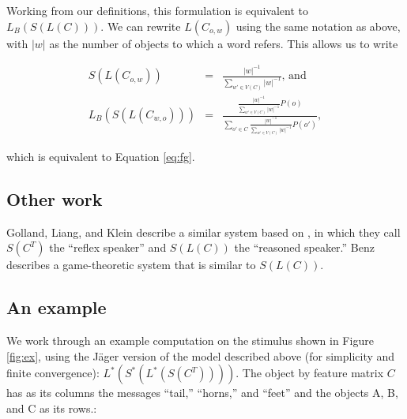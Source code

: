 Working from our definitions, this formulation is equivalent to $L_B(S(L(C)))$. We can rewrite $L(C_{o,w})$ using the same notation as above, with $|w|$ as the number of objects to which a word refers. This allows us to write 

\begin{eqnarray*}
S(L(C_{o,w})) &=& \frac{|w|^{-1}}{\displaystyle \sum_{w' \in V(C)} |w|^{-1}} \mbox{, and} \\
L_B(S(L(C_{w,o}))) &=& \frac{ \frac{\displaystyle |w|^{-1}}{\displaystyle \sum_{w' \in V(C)} |w|^{-1}}P(o)}{\displaystyle\sum_{o' \in C}  \frac{|w|^{-1}}{\displaystyle \sum_{w' \in V(C)} |w|^{-1}}P(o')},
\end{eqnarray*}

which is equivalent to Equation \ref{eq:fg}.

\subsection{Other work}

Golland, Liang, and Klein \cite{golland2010} describe a similar system based on \cite{jaegerinpress}, in which they call $S(C^T)$ the ``reflex speaker'' and $S(L(C))$ the ``reasoned speaker.'' Benz \cite{benz2005b} describes a game-theoretic system that is similar to $S(L(C))$. 

\subsection{An example}


We work through an example computation on the stimulus shown in Figure \ref{fig:ex}, using the J\"ager \cite{jaegerinpress} version of the model described above (for simplicity and finite convergence): $L^*(S^*(L^*(S(C^T))))$. The object by feature matrix $C$ has as its columns the messages ``tail,'' ``horns,'' and ``feet'' and the objects A, B, and C as its rows.:

